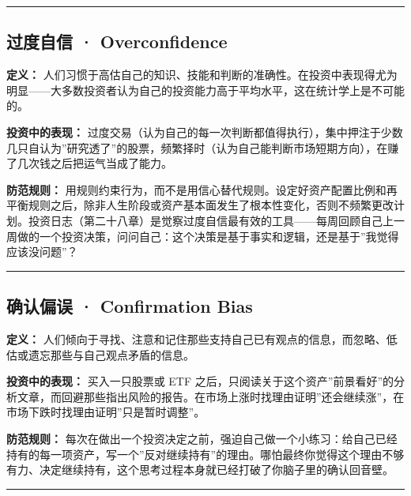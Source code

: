 \documentclass[a4paper,11pt,oneside,fontset=none,UTF8,zihao=-4]{ctexbook}
\begin{document}
\begin{center}{\color{dh-bronze}\rule{0.2\textwidth}{0.5pt}}\end{center}

\subsection{过度自信 ·
Overconfidence}\label{ux8fc7ux5ea6ux81eaux4fe1-overconfidence}

\textbf{定义：}
人们习惯于高估自己的知识、技能和判断的准确性。在投资中表现得尤为明显------大多数投资者认为自己的投资能力高于平均水平，这在统计学上是不可能的。

\textbf{投资中的表现：}
过度交易（认为自己的每一次判断都值得执行），集中押注于少数几只自认为''研究透了''的股票，频繁择时（认为自己能判断市场短期方向），在赚了几次钱之后把运气当成了能力。

\textbf{防范规则：}
用规则约束行为，而不是用信心替代规则。设定好资产配置比例和再平衡规则之后，除非人生阶段或资产基本面发生了根本性变化，否则不频繁更改计划。投资日志（第二十八章）是觉察过度自信最有效的工具------每周回顾自己上一周做的一个投资决策，问问自己：这个决策是基于事实和逻辑，还是基于''我觉得应该没问题''？

\begin{center}{\color{dh-bronze}\rule{0.2\textwidth}{0.5pt}}\end{center}

\subsection{确认偏误 · Confirmation
Bias}\label{ux786eux8ba4ux504fux8bef-confirmation-bias}

\textbf{定义：}
人们倾向于寻找、注意和记住那些支持自己已有观点的信息，而忽略、低估或遗忘那些与自己观点矛盾的信息。

\textbf{投资中的表现：} 买入一只股票或 ETF
之后，只阅读关于这个资产''前景看好''的分析文章，而回避那些指出风险的报告。在市场上涨时找理由证明''还会继续涨''，在市场下跌时找理由证明''只是暂时调整''。

\textbf{防范规则：}
每次在做出一个投资决定之前，强迫自己做一个小练习：给自己已经持有的每一项资产，写一个''反对继续持有''的理由。哪怕最终你觉得这个理由不够有力、决定继续持有，这个思考过程本身就已经打破了你脑子里的确认回音壁。

\begin{center}{\color{dh-bronze}\rule{0.2\textwidth}{0.5pt}}\end{center}
\end{document}
